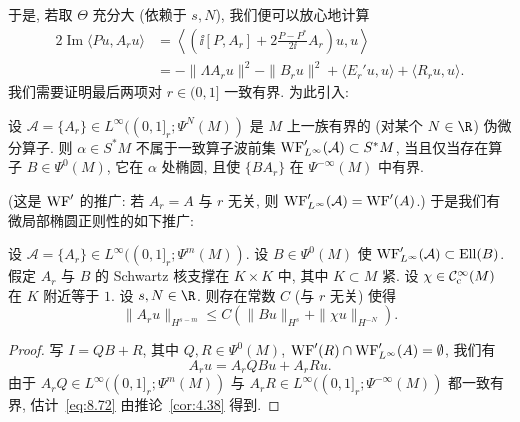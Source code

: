于是, 若取 $\Theta$ 充分大 (依赖于 $s, N$), 我们便可以放心地计算
\begin{equation}\label{eq:8.71}
    \begin{aligned}
        2 \operatorname{Im} \langle P u, A_r u \rangle
        &= \left\langle \left( \ii[P, A_r] + 2\frac{P - P^*}{2\ii}A_r \right)u, u \right\rangle \\
        &= -\| \Lambda A_r u \|^2 - \| B_r u \|^2 + \langle E_r' u, u \rangle + \langle R_r u, u \rangle.
    \end{aligned}
\end{equation}
我们需要证明最后两项对 $r \in (0, 1]$ 一致有界. 为此引入:

\begin{definition}[一致算子波前集]\label{def:8.17}
设 $\mathcal{A} = \{A_r\} \in L^\infty((0, 1]_r; \Psi^N(M))$ 是 $M$ 上一族有界的 (对某个 $N \in \R$) 伪微分算子. 则 $\alpha \in S^*M$ 不属于一致算子波前集 $\operatorname{WF}'_{L^\infty}(\mathcal{A}) \subset S^*M$, 当且仅当存在算子 $B \in \Psi^0(M)$, 它在 $\alpha$ 处椭圆, 且使 $\{BA_r\}$ 在 $\Psi^{-\infty}(M)$ 中有界.
\end{definition}

(这是 $\operatorname{WF}'$ 的推广: 若 $A_r = A$ 与 $r$ 无关, 则 $\operatorname{WF}'_{L^\infty}(\mathcal{A}) = \operatorname{WF}'(A)$.) 于是我们有微局部椭圆正则性的如下推广:

\begin{lemma}[一致微局部椭圆正则性]\label{lem:8.18}
设 $\mathcal{A} = \{A_r\} \in L^\infty((0, 1]_r; \Psi^m(M))$. 设 $B \in \Psi^0(M)$ 使 $\operatorname{WF}'_{L^\infty}(\mathcal{A}) \subset \operatorname{Ell}(B)$. 假定 $A_r$ 与 $B$ 的 Schwartz 核支撑在 $K \times K$ 中, 其中 $K \subset M$ 紧. 设 $\chi \in \mathcal{C}_{\mathrm{c}}^\infty(M)$ 在 $K$ 附近等于 $1$. 设 $s, N \in \R$. 则存在常数 $C$ (与 $r$ 无关) 使得
\begin{equation}\label{eq:8.72}
    \| A_r u \|_{H^{s-m}} \le C\left( \| B u \|_{H^s} + \| \chi u \|_{H^{-N}} \right).
\end{equation}
\end{lemma}

\begin{proof}
写 $I = QB + R$, 其中 $Q, R \in \Psi^0(M)$, $\operatorname{WF}'(R) \cap \operatorname{WF}'_{L^\infty}(A) = \emptyset$, 我们有
\begin{equation}\label{eq:8.73}
    A_r u = A_r QBu + A_rRu.
\end{equation}
由于 $A_rQ \in L^\infty((0, 1]_r; \Psi^m(M))$ 与 $A_rR \in L^\infty((0, 1]_r; \Psi^{-\infty}(M))$ 都一致有界, 估计~\eqref{eq:8.72} 由推论~\ref{cor:4.38} 得到.
\end{proof}

